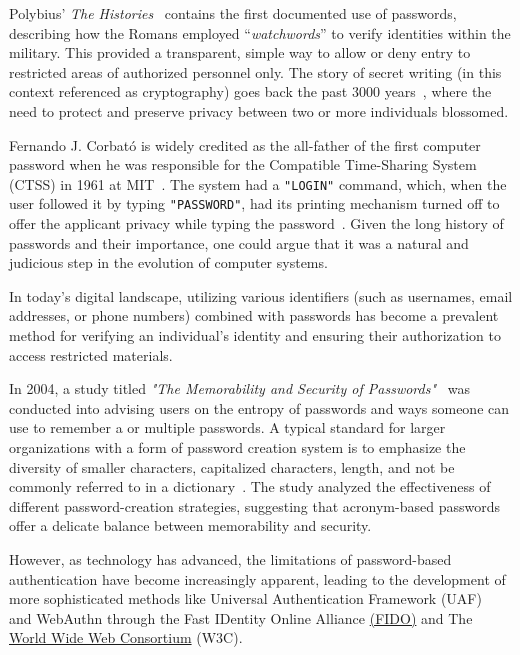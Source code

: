 Polybius' \textit{The Histories}~\cite{perseus_tufts} contains the first documented use of passwords, describing how
the Romans employed ``\textit{watchwords}'' to verify identities within the military.
This provided a transparent, simple way to allow or deny entry to restricted areas of authorized personnel only.
The story of secret writing (in this context referenced as cryptography) goes back the past 3000 years~\cite{history_cryptography_cryptanalysis},
where the need to protect and preserve privacy between two or more individuals blossomed.

Fernando J. Corbató is widely credited as the all-father of the first computer password when he was responsible for
the Compatible Time-Sharing System (CTSS) in 1961 at MIT~\cite{levy1984hackers}.
The system had a \texttt{"LOGIN"} command, which, when the user followed it by typing \texttt{"PASSWORD"},
had its printing mechanism turned off to offer the applicant privacy while typing the password~\cite{ctss_programmers_guide}.
Given the long history of passwords and their importance, one could argue that it was a natural and judicious
step in the evolution of computer systems.

In today's digital landscape, utilizing various identifiers (such as usernames, email addresses, or phone numbers)
combined with passwords has become a prevalent method for verifying an individual's identity and ensuring
their authorization to access restricted materials.

In 2004, a study titled \textit{"The Memorability and Security of Passwords"}~\cite{yan2000password} was conducted into
advising users on the entropy of passwords and ways someone can use to remember a or multiple passwords.
A typical standard for larger organizations with a form of password creation system is to emphasize the diversity of
smaller characters, capitalized characters, length, and not be commonly referred to in a dictionary~\cite{yan2000password}.
The study analyzed the effectiveness of different password-creation strategies, suggesting that acronym-based
passwords offer a delicate balance between memorability and security\cite{yan2000password}.

However, as technology has advanced, the limitations of password-based authentication have become increasingly
apparent, leading to the development of more sophisticated methods like Universal Authentication Framework
(UAF)~\cite{fido_uaf_overview} and WebAuthn\cite{webauthn_level_2} through the Fast IDentity Online Alliance
\href{https://fidoalliance.org}{(FIDO)} and The \href{https://www.w3.org}{World Wide Web Consortium} (W3C).

